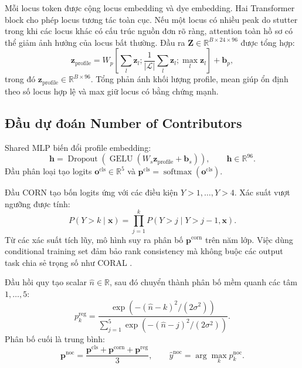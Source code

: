 \documentclass[12pt,a4paper]{article}
\begin{document}
Mỗi locus token được cộng locus embedding và dye embedding. Hai Transformer block cho phép locus tương tác toàn cục. Nếu một locus có nhiều peak do stutter trong khi các locus khác có cấu trúc nguồn đơn rõ ràng, attention toàn hồ sơ có thể giảm ảnh hưởng của locus bất thường. Đầu ra
\(\bm{Z}\in\mathbb{R}^{B\times24\times96}\) được tổng hợp:
\begin{equation}
\bm{z}_{\mathrm{profile}}=
W_p\left[
\sum_l\bm{z}_l;
\frac{1}{|\mathcal{L}|}\sum_l\bm{z}_l;
\max_l\bm{z}_l
\right]+\bm{b}_p,
\end{equation}
trong đó \(\bm{z}_{\mathrm{profile}}\in\mathbb{R}^{B\times96}\). Tổng phản ánh khối lượng profile, mean giúp ổn định theo số locus hợp lệ và max giữ locus có bằng chứng mạnh.

\subsection{Đầu dự đoán Number of Contributors}

Shared MLP biến đổi profile embedding:
\begin{equation}
\bm{h}=\operatorname{Dropout}\left(
\operatorname{GELU}(W_s\bm{z}_{\mathrm{profile}}+\bm{b}_s)
\right),\qquad \bm{h}\in\mathbb{R}^{96}.
\end{equation}
Đầu phân loại tạo logits \(\bm{o}^{\mathrm{cls}}\in\mathbb{R}^{5}\) và
\(\bm{p}^{\mathrm{cls}}=\operatorname{softmax}(\bm{o}^{\mathrm{cls}})\).

Đầu CORN tạo bốn logits ứng với các điều kiện \(Y>1,\ldots,Y>4\). Xác suất vượt ngưỡng được tính:
\begin{equation}
P(Y>k\mid\bm{x})=
\prod_{j=1}^{k}
P(Y>j\mid Y>j-1,\bm{x}).
\end{equation}
Từ các xác suất tích lũy, mô hình suy ra phân bố \(\bm{p}^{\mathrm{corn}}\) trên năm lớp. Việc dùng conditional training set đảm bảo rank consistency mà không buộc các output task chia sẻ trọng số như CORAL \cite{shi2023corn}.

Đầu hồi quy tạo scalar \(\hat{n}\in\mathbb{R}\), sau đó chuyển thành phân bố mềm quanh các tâm \(1,\ldots,5\):
\begin{equation}
p_k^{\mathrm{reg}}=
\frac{\exp\left(-(\hat{n}-k)^2/(2\sigma^2)\right)}
{\sum_{j=1}^{5}\exp\left(-(\hat{n}-j)^2/(2\sigma^2)\right)}.
\end{equation}
Phân bố cuối là trung bình:
\begin{equation}
\bm{p}^{\mathrm{noc}}=
\frac{\bm{p}^{\mathrm{cls}}+\bm{p}^{\mathrm{corn}}+\bm{p}^{\mathrm{reg}}}{3},
\qquad
\hat{y}^{\mathrm{noc}}=\arg\max_k p_k^{\mathrm{noc}}.
\end{equation}
\end{document}
